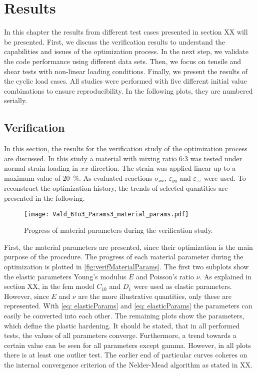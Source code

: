     \chapter{Results}\label{chap: results}

In this chapter the results from different test cases presented in section XX will be presented. First, we discuss the verification results to understand the capabilities and issues of the optimization process. In the next step, we validate the code performance using different data sets. Then, we focus on tensile and shear tests with non-linear loading conditions. 
Finally, we present the results of the cyclic load cases. All studies were performed with five different initial value combinations to ensure reproducibility. In the following plots, they are numbered serially. 


\section{Verification}\label{sec: verification}

In this section, the results for the verification study of the optimization process are discussed. In this study a material with mixing ratio 6:3 was tested under normal strain loading in $xx$-direction. The strain was applied linear up to a maximum value of 20 \%. As evaluated reactions $\sigma_{xx}$, $\varepsilon_{yy}$ and $\varepsilon_{zz}$ were used. To reconstruct the optimization history, the trends of selected quantities are presented in the following.

\begin{figure}[H]
    \centering
    \texttt{[image: Vald\_6To3\_Params3\_material\_params.pdf]}
    \caption{Progress of material parameters during the verification study.}
    \label{fig:verifMaterialParams}
\end{figure}

First, the material parameters are presented, since their optimization is the main purpose of the procedure. The progress of each material parameter during the optimization is plotted in \autoref{fig:verifMaterialParams}. The first two subplots show the elastic parameters Young's modulus $E$ and Poisson's ratio $\nu$. As explained in section XX, in the \acrshort{fem} model $C_{10}$ and $D_1$ were used as elastic parameters. However, since $E$ and $\nu$ are the more illustrative quantities, only these are represented. With \autoref{eq: elasticParams} and \ref{eq: elasticParams} the parameters can easily be converted into each other. The remaining plots show the parameters, which define the plastic hardening. It should be stated, that in all performed tests, the values of all parameters converge. Furthermore, a trend towards a certain value can be seen for  all parameters except gamma. However, in all plots there is at least one outlier test. The earlier end of particular curves coheres on the internal convergence criterion of the Nelder-Mead algorithm as stated in XX. 

